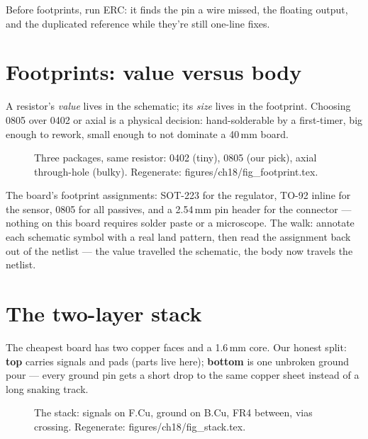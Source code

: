 \begin{checkpoint}
Before footprints, run ERC: it finds the pin a wire missed, the
floating output, and the duplicated reference while they're still
one-line fixes.
\end{checkpoint}

\section{Footprints: value versus body}\label{sec:footprint18}

A resistor's \emph{value} lives in the schematic; its \emph{size}
lives in the footprint. Choosing 0805 over 0402 or axial is a
physical decision: hand-solderable by a first-timer, big enough to
rework, small enough to not dominate a 40\,mm board.

\begin{figure}[htbp]
\centering

\caption{Three packages, same resistor: 0402 (tiny), 0805 (our pick),
axial through-hole (bulky). Regenerate: \ttfamily
figures/ch18/fig\_footprint.tex.}
\label{fig:footprint18}
\end{figure}

\begin{example}
The board's footprint assignments: SOT-223 for the regulator,
TO-92 inline for the sensor, 0805 for all passives, and a
2.54\,mm pin header for the connector --- nothing on this board
requires solder paste or a microscope. The walk: annotate each
schematic symbol with a real land pattern, then read the
assignment back out of the netlist --- the value travelled the
schematic, the body now travels the netlist.
\end{example}

\section{The two-layer stack}\label{sec:stack18}

The cheapest board has two copper faces and a 1.6\,mm core. Our
honest split: \textbf{top} carries signals and pads (parts live
here); \textbf{bottom} is one unbroken ground pour --- every ground
pin gets a short drop to the same copper sheet instead of a long
snaking track.

\begin{figure}[htbp]
\centering

\caption{The stack: signals on F.Cu, ground on B.Cu, FR4 between,
vias crossing. Regenerate: \ttfamily figures/ch18/fig\_stack.tex.}
\label{fig:stack18}
\end{figure}

